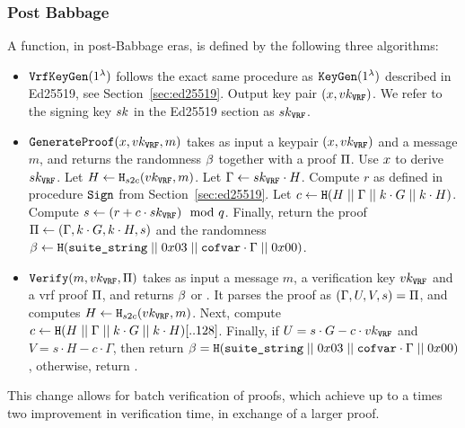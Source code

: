 \subsubsection{Post Babbage}
A \vrf function, in post-Babbage eras, is defined by the following three algorithms:
\begin{itemize}
    \item $\texttt{VrfKeyGen}(1^\lambda)$ follows the exact same procedure as $\texttt{KeyGen}(1^\lambda)$ described in Ed25519,
    see Section~\ref{sec:ed25519}. Output key pair $(x, vk_{\texttt{VRF}})$. We refer to the signing key
    $sk$ in the Ed25519 section as $sk_{\texttt{VRF}}$.
    \item $\texttt{GenerateProof}(x, vk_{\texttt{VRF}}, m)$ takes as input a keypair $(x, vk_{\texttt{VRF}})$ and a message
    $m$, and returns the \vrf randomness $\beta$ together with a proof $\Pi$. Use $x$ to
    derive $sk_{\texttt{VRF}}$. Let $H \gets \texttt{H}_{s2c}(vk_{\texttt{VRF}}, m)$. Let $\Gamma \gets sk_{\texttt{VRF}}\cdot H$. Compute $r$ as
    defined in procedure $\texttt{Sign}$ from Section~\ref{sec:ed25519}. Let $c \gets \texttt{H}
    (H\;||\;\Gamma\;||\; k\cdot G\;||\; k\cdot H)$. Compute $s \gets (r + c\cdot sk_{\texttt{VRF}})
    \mod{q}$. Finally, return the proof $\Pi \gets (\Gamma, k\cdot G, k\cdot H, s)$ and the
    randomness $\beta \gets  \texttt{H}(\texttt{suite\_string}\;||\;
    0x03\;||\;\texttt{cofvar}\cdot\Gamma\;||\; 0x00)$.
    \item $\texttt{Verify}(m, vk_{\texttt{VRF}}, \Pi)$ takes as input a message $m$, a verification key $vk_{\texttt{VRF}}$ and a vrf proof
    $\Pi$, and returns $\beta$ or \false. It parses the proof as $(\Gamma, U, V, s) = \Pi$,
    and computes $H\gets\texttt{H}_{s2c}(vk_{\texttt{VRF}}, m)$. Next, compute $c \gets \texttt{H}(H\;||\;\Gamma\;||\;
    k\cdot G\;||\; k\cdot H)[..128]$. Finally, if $U = s\cdot G - c\cdot vk_{\texttt{VRF}}$ and $V = s\cdot
    H - c\cdot\Gamma$, then return $\beta =  \texttt{H}(\texttt{suite\_string}\;||\;
    0x03\;||\;\texttt{cofvar}\cdot\Gamma\;||\; 0x00)$, otherwise, return \false.
\end{itemize}

This change allows for batch verification of proofs, which achieve up to a times two improvement in verification
time, in exchange of a larger proof.

